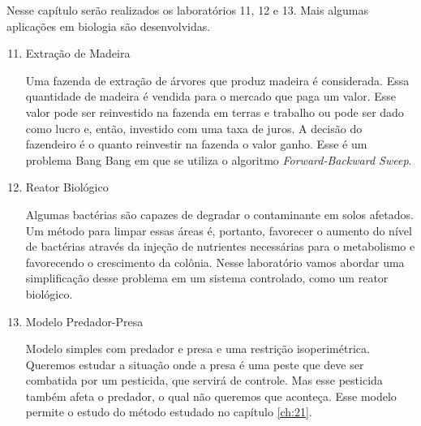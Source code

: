 Nesse capítulo serão realizados os laboratórios 11, 12 e 13. Mais algumas
aplicações em biologia são desenvolvidas.

\begin{enumerate}[label=\textbf{Lab \arabic*:}]
    \setcounter{enumi}{10}

    \item Extração de Madeira
    
    Uma fazenda de extração de árvores que produz madeira é considerada. Essa
    quantidade de madeira é vendida para o mercado que paga um valor. Esse
    valor pode ser reinvestido na fazenda em terras e trabalho ou pode ser
    dado como lucro e, então, investido com uma taxa de juros. A decisão do
    fazendeiro é o quanto reinvestir na fazenda o valor ganho.
    Esse é um problema Bang Bang em que se utiliza o algoritmo
    \textit{Forward-Backward Sweep}. 

    \item Reator Biológico 
    
    Algumas bactérias são capazes de degradar o contaminante em solos
    afetados. Um método para limpar essas áreas é, portanto, favorecer o
    aumento do nível de bactérias através da injeção de nutrientes
    necessárias para o metabolismo e favorecendo o crescimento da colônia.
    Nesse laboratório vamos abordar uma simplificação desse problema em um
    sistema controlado, como um reator biológico. 

    \item Modelo Predador-Presa 
    
    Modelo simples com predador e presa e uma restrição isoperimétrica.
    Queremos estudar a situação onde a presa é uma peste que deve ser
    combatida por um pesticida, que servirá de controle. Mas esse pesticida
    também afeta o predador, o qual não queremos que aconteça. Esse modelo
    permite o estudo do método estudado no capítulo \ref{ch:21}. 
    

\end{enumerate}